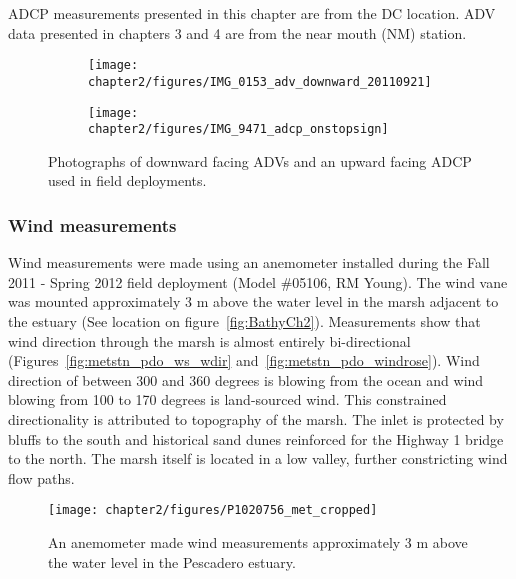 ADCP measurements presented in this chapter are from the DC location. ADV data presented in chapters 3 and 4 are from the near mouth (NM) station. 


\begin{figure}[t]
\begin{subfigure}{.5\textwidth}
	\texttt{[image: chapter2/figures/IMG\_0153\_adv\_downward\_20110921]}
\end{subfigure}
\begin{subfigure}{.5\textwidth}
	\texttt{[image: chapter2/figures/IMG\_9471\_adcp\_onstopsign]}
\end{subfigure}
\caption{Photographs of downward facing ADVs and an upward facing ADCP used in field deployments.} \label{fig:ADVADCPphoto}
\end{figure}


\subsubsection{Wind measurements} \label{sssec:windmeas}
Wind measurements were made using an anemometer installed during the Fall 2011 - Spring 2012 field deployment (Model \#05106, RM Young). The wind vane was mounted approximately 3 m above the water level in the marsh adjacent to the estuary (See location on figure~\ref{fig:BathyCh2}).  Measurements show that wind direction through the marsh is almost entirely bi-directional (Figures~\ref{fig:metstn_pdo_ws_wdir} and~\ref{fig:metstn_pdo_windrose}). Wind direction of between 300 and 360 degrees is blowing from the ocean and wind blowing from 100 to 170 degrees is land-sourced wind. This constrained directionality is attributed to topography of the marsh.  The inlet is protected by bluffs to the south and historical sand dunes reinforced for the Highway 1 bridge to the north. The marsh itself is located in a low valley, further constricting wind flow paths. 



\begin{figure} %
	\texttt{[image: chapter2/figures/P1020756\_met\_cropped]} \caption{An anemometer made wind measurements approximately 3 m above the water level in the Pescadero estuary.}
\label{fig:metstnPhoto} 
\end{figure}



